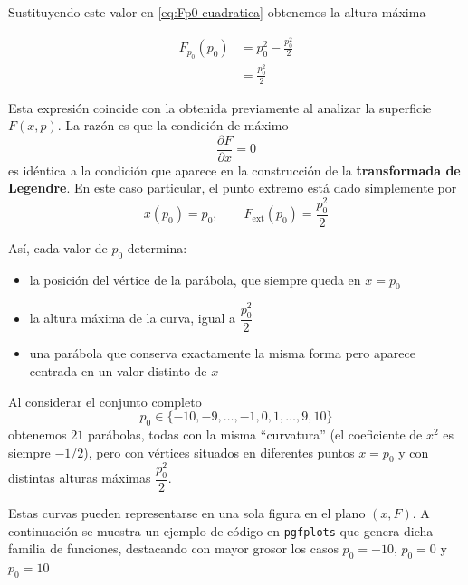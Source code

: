 \documentclass{article}
\begin{document}
Sustituyendo este valor en \eqref{eq:Fp0-cuadratica} obtenemos la altura máxima

\begin{equation}
\begin{split}
F_{p_{0}}(p_{0})
&= p_{0}^{2} - \frac{p_{0}^{2}}{2} \\[4pt]
&= \frac{p_{0}^{2}}{2}
\end{split}\label{eq:maximo-cuadratica}
\end{equation}

Esta expresión coincide con la obtenida previamente al analizar la superficie
\(F(x,p)\). La razón es que la condición de máximo
\[
\frac{\partial F}{\partial x} = 0
\]
es idéntica a la condición que aparece en la construcción de la
\textcolor{trueblue}{\textbf{transformada de Legendre}}. En este caso particular, el
punto extremo está dado simplemente por
\[
x(p_{0}) = p_{0},
\qquad
F_{\text{ext}}(p_{0}) = \frac{p_{0}^{2}}{2}
\]

Así, cada valor de \(p_{0}\) determina:

\begin{itemize}
  \item[$\bullet$] la posición del vértice de la parábola, que siempre queda en \(x=p_{0}\)
  \item[$\bullet$] la altura máxima de la curva, igual a \(\dfrac{p_{0}^{2}}{2}\)
  \item[$\bullet$] una parábola que conserva exactamente la misma forma pero aparece centrada en un valor distinto de \(x\)
\end{itemize}


Al considerar el conjunto completo
\[
p_{0}\in\{-10,-9,\dots,-1,0,1,\dots,9,10\}
\]
obtenemos \(21\) parábolas, todas con la misma “curvatura” (el coeficiente de \(x^{2}\)
es siempre \(-1/2\)), pero con vértices situados en diferentes puntos \(x=p_{0}\) y con
distintas alturas máximas \(\dfrac{p_{0}^{2}}{2}\).

Estas curvas pueden representarse en una sola figura en el plano \((x,F)\). A
continuación se muestra un ejemplo de código en \texttt{pgfplots} que genera dicha
familia de funciones, destacando con mayor grosor los casos \(p_{0}=-10\), \(p_{0}=0\)
y \(p_{0}=10\)
\end{document}
